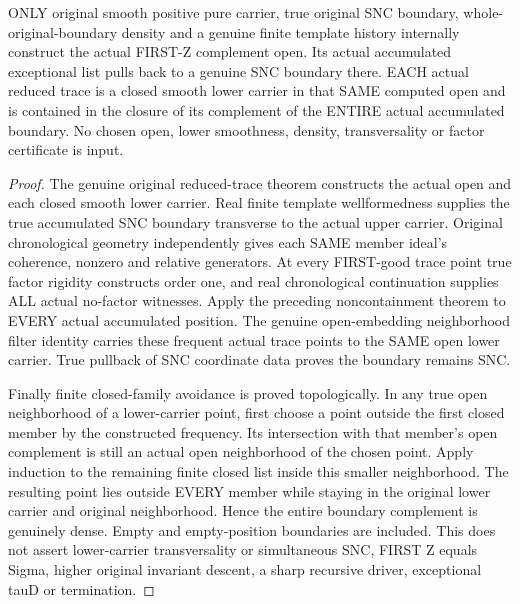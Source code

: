\begin{theorem}
\label{hir:sharp-original-first-good-whole-exceptional-trace-density}
\leanok
ONLY original smooth positive pure carrier, true original SNC boundary,
whole-original-boundary density and a genuine finite template history
internally construct the actual FIRST-Z complement open. Its actual
accumulated exceptional list pulls back to a genuine SNC boundary there.
EACH actual reduced trace is a closed smooth lower carrier in that SAME
computed open and is contained in the closure of its complement of the
ENTIRE actual accumulated boundary. No chosen open, lower smoothness,
density, transversality or factor certificate is input.
\end{theorem}
\begin{proof}
The genuine original reduced-trace theorem constructs the actual open and
each closed smooth lower carrier. Real finite template wellformedness
supplies the true accumulated SNC boundary transverse to the actual upper
carrier. Original chronological geometry independently gives each SAME
member ideal's coherence, nonzero and relative generators. At every
FIRST-good trace point true factor rigidity constructs order one, and
real chronological continuation supplies ALL actual no-factor witnesses.
Apply the preceding noncontainment theorem to EVERY actual accumulated
position. The genuine open-embedding neighborhood filter identity carries
these frequent actual trace points to the SAME open lower carrier.
True pullback of SNC coordinate data proves the boundary remains SNC.

Finally finite closed-family avoidance is proved topologically. In any
true open neighborhood of a lower-carrier point, first choose a point
outside the first closed member by the constructed frequency. Its
intersection with that member's open complement is still an actual open
neighborhood of the chosen point. Apply induction to the remaining finite
closed list inside this smaller neighborhood. The resulting point lies
outside EVERY member while staying in the original lower carrier and
original neighborhood. Hence the entire boundary complement is genuinely
dense. Empty and empty-position boundaries are included. This does not
assert lower-carrier transversality or simultaneous SNC, FIRST Z equals
Sigma, higher original invariant descent, a sharp recursive driver,
exceptional tauD or termination.
\end{proof}
